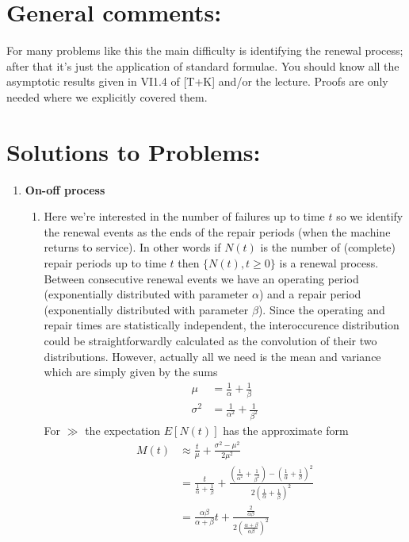 \documentclass[11pt,a4paper]{article}
\begin{document}
  \section*{General comments:}
  For many problems like this the main difficulty is identifying the renewal process; after that it's just the application of standard formulae. You should know all the asymptotic results given in VI1.4 of [T+K] and/or the lecture. Proofs are only needed where we explicitly covered them.
  \section*{Solutions to Problems:}
  \begin{enumerate}
    \item \textbf{On-off process}
    \begin{enumerate}
      \item Here we're interested in the number of failures up to time $t$ so we identify the renewal events as the ends of the repair periods (when the machine returns to service). In other words if $N(t)$ is the number of (complete) repair periods up to time $t$ then $\{N(t), t \geq 0\}$ is a renewal process. Between consecutive renewal events we have an operating period (exponentially distributed with parameter $\alpha$) and a repair period (exponentially distributed with parameter $\beta$). Since the operating and repair times are statistically independent, the interoccurence distribution could be straightforwardly calculated as the convolution of their two distributions. However, actually all we need is the mean and variance which are simply given by the sums
      \begin{align*}
        \mu &= \frac{1}{\alpha} + \frac{1}{\beta}\\
        \sigma^2 &= \frac{1}{\alpha^2} + \frac{1}{\beta^2}
      \end{align*}
      For $\gg$ the expectation $E[N(t)]$ has the approximate form
      \begin{align*}
        M(t)
        &\approx \frac{t}{\mu} + \frac{\sigma^2 - \mu^2}{2\mu^2}\\
        &= \frac{t}{\frac{1}{\alpha} + \frac{1}{\beta}} + \frac{\left(\frac{1}{\alpha^2} + \frac{1}{\beta^2}\right) - \left(\frac{1}{\alpha} + \frac{1}{\beta}\right)^2}{2\left(\frac{1}{\alpha} + \frac{1}{\beta}\right)^2}\\
        &= \frac{\alpha\beta}{\alpha + \beta}t + \frac{\frac{2}{\alpha\beta}}{2\left(\frac{\alpha + \beta}{\alpha\beta}\right)^2}\\

\end{align*}
\end{enumerate}
\end{enumerate}
\end{document}
